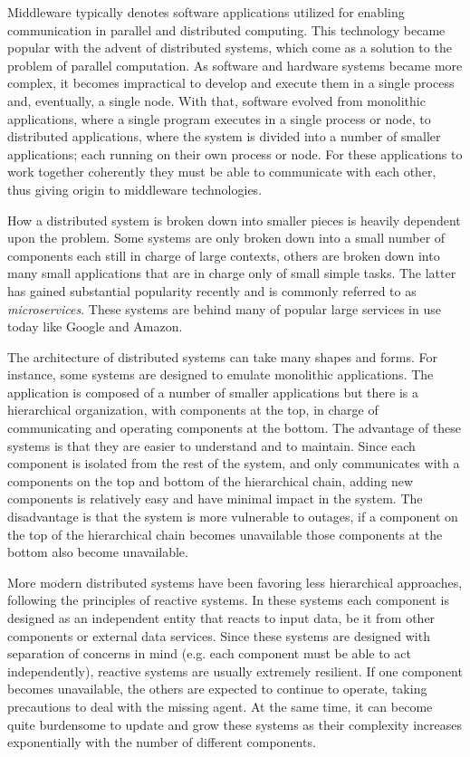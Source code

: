 \documentclass[]{spie}  %
\begin{document}
Middleware typically denotes software applications utilized for enabling communication in parallel and distributed computing\cite{BUYYA201329}.
This technology became popular with the advent of distributed systems, which come as a solution to the problem of parallel computation.
As software and hardware systems became more complex, it becomes impractical to develop and execute them in a single process and, eventually, a single node.
With that, software evolved from monolithic applications, where a single program executes in a single process or node, to distributed applications, where the system is divided into a number of smaller applications; each running on their own process or node.
For these applications to work together coherently they must be able to communicate with each other, thus giving origin to middleware technologies.

How a distributed system is broken down into smaller pieces is heavily dependent upon the problem.
Some systems are only broken down into a small number of components each still in charge of large contexts, others are broken down into many small applications that are in charge only of small simple tasks.
The latter has gained substantial popularity recently and is commonly referred to as \textit{microservices}.
These systems are behind many of popular large services in use today like Google and Amazon.

The architecture of distributed systems can take many shapes and forms.
For instance, some systems are designed to emulate monolithic applications.
The application is composed of a number of smaller applications but there is a hierarchical organization, with components at the top, in charge of communicating and operating components at the bottom.
The advantage of these systems is that they are easier to understand and to maintain.
Since each component is isolated from the rest of the system, and only communicates with a components on the top and bottom of the hierarchical chain, adding new components is relatively easy and have minimal impact in the system.
The disadvantage is that the system is more vulnerable to outages, if a component on the top of the hierarchical chain becomes unavailable those components at the bottom also become unavailable.

More modern distributed systems have been favoring less hierarchical approaches, following the principles of reactive systems.
In these systems each component is designed as an independent entity that reacts to input data, be it from other components or external data services.
Since these systems are designed with separation of concerns in mind (e.g. each component must be able to act independently), reactive systems are usually extremely resilient.
If one component becomes unavailable, the others are expected to continue to operate, taking precautions to deal with the missing agent.
At the same time, it can become quite burdensome to update and grow these systems as their complexity increases exponentially with the number of different components.
\end{document}
